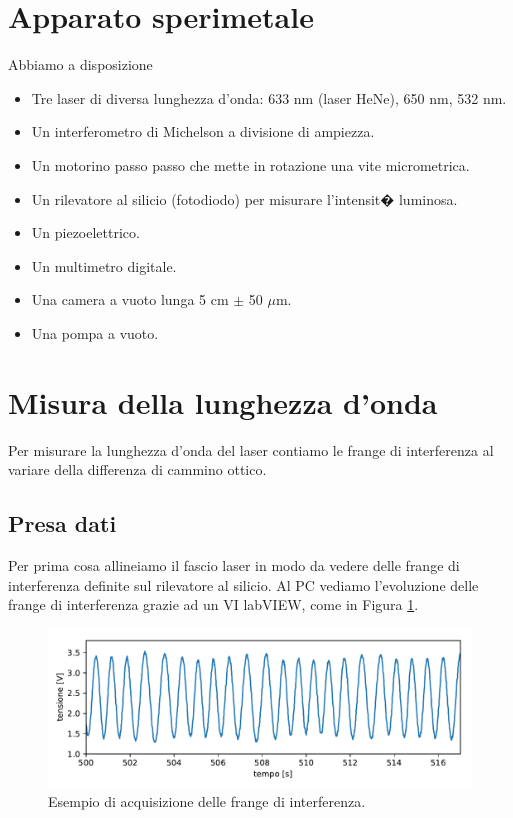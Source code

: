 \documentclass[a4paper]{article}
\begin{document}
\begin{multicols}{2}

\section{Apparato sperimetale}

	Abbiamo a disposizione 
	\begin{itemize}
		\item Tre laser di diversa lunghezza d'onda: 633 nm (laser HeNe), 650 nm, 532 nm.
		\item Un interferometro di Michelson a divisione di ampiezza.
		\item Un motorino passo passo che mette in rotazione una vite micrometrica.
		\item Un rilevatore al silicio (fotodiodo) per misurare l'intensit� luminosa.
		\item Un piezoelettrico.
		\item Un multimetro digitale.
		\item Una camera a vuoto lunga 5 cm $\pm$ 50 $\mu$m.
		\item Una pompa a vuoto.
	\end{itemize}

\section{Misura della lunghezza d'onda}
Per misurare la lunghezza d'onda del laser contiamo le frange di interferenza al variare della differenza di cammino ottico. 

\subsection{Presa dati}
Per prima cosa allineiamo il fascio laser in modo da vedere delle frange di interferenza definite sul rilevatore al silicio. 
Al PC vediamo l'evoluzione delle frange di interferenza grazie ad un VI labVIEW, come in Figura \ref{fig:esempio_acquisizione_frange}.

\end{multicols}

\begin{figure}[H]
	\includegraphics[width=1\textwidth]{esempio_acquisizione_frange.pdf}
	\caption{Esempio di acquisizione delle frange di interferenza.}
	\label{fig:esempio_acquisizione_frange}
\end{figure}
\end{document}
